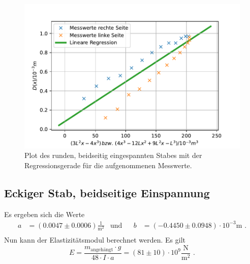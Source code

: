 \begin{figure}[H]
  \centering
  \includegraphics{pictures/Lineare Regression3.pdf}
  \caption{Plot des runden, beidseitig eingespannten Stabes mit der Regressionsgerade für die aufgenommenen Messwerte.}
  \label{fig:plot3}
\end{figure}


\subsection{Eckiger Stab, beidseitige Einspannung}

Es ergeben sich die Werte 
\begin{align*}
  a &= (0.0047 ± 0.0006) \frac{1}{\unit{\meter\squared}} & \text{und}& & b&= (-0.4450 ± 0.0948) \cdot 10^{-3} \unit\meter \text{ .} \\
\end{align*}
Nun kann der Elastizitätsmodul berechnet werden. Es gilt
\begin{equation*}
  E = \frac{m_\text{angehängt} \cdot g}{48 \cdot I \cdot a} = (81\pm 10) \cdot 10^{9} \frac{\unit\newton}{\unit\meter^2} \text{ .}
\end{equation*}




